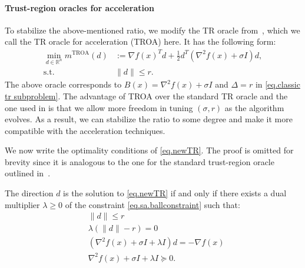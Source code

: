 \documentclass{article}
\begin{document}
\paragraph{Trust-region oracles for acceleration}
To stabilize the above-mentioned ratio, we modify the TR oracle from~\citet{jiang2024nonconvexityuniversaltrustregionmethod}, which we call the TR oracle for acceleration (TROA) here. It has the following form:
\begin{subequations}\label{eq.newTR}
    \begin{align}
        \min_{d \in \mathbb{R}^n} m^{\text{TROA}}(d) &:=\nabla f(x)^T d + \tfrac{1}{2}d^T (\nabla^2 f(x) + \sigma I) d, \\\label{eq.sa.ballconstraint} \operatorname{s.t.} ~& \|d\| \le r.
    \end{align}
\end{subequations}
The above oracle corresponds to $B(x)= \nabla^2 f(x)+\sigma I $ and $\Delta = r$ in \eqref{eq.classic tr subproblem}. The advantage of TROA over the standard TR oracle and the one used in \cite{jiang2024nonconvexityuniversaltrustregionmethod} is that we allow more freedom in tuning $(\sigma,r)$ as the algorithm evolves. As a result, we can stabilize the ratio to some degree and make it more compatible with the acceleration techniques.

We now write the optimality conditions of \eqref{eq.newTR}. The proof is omitted for brevity since it is analogous to the one for the standard trust-region oracle outlined in~\citet[Section 3]{conn2000trust}.
\begin{lemma}\label{lem.optimal condition}
    The direction $d$ is the solution to \eqref{eq.newTR} if and only if there exists a dual multiplier $\lambda \geq 0$ of the constraint \eqref{eq.sa.ballconstraint} such that: \begin{subequations}\label{eq.sa}
        \begin{align}
            \label{eq.optcond primal}
             & \| d\| \leq r                                                       \\
            \label{eq.optcond coml slack}
             & \lambda \left(\|d\|-r \right)=0                                     \\ \label{eq.optcond firstorder}
             & \left(\nabla^2 f(x) + \sigma I + \lambda I \right) d = -\nabla f(x) \\
            \label{eq.optcond secondorder}
             & \nabla^2 f(x) + \sigma I + \lambda I \succeq 0.
        \end{align}
    \end{subequations}
\end{lemma}
\end{document}
